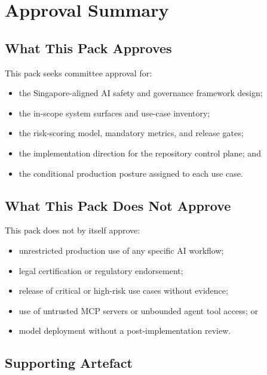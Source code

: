 \documentclass[11pt,a4paper]{article}
\begin{document}
\section{Approval Summary}

\subsection{What This Pack Approves}

This pack seeks committee approval for:

\begin{itemize}[nosep]
    \item the Singapore-aligned AI safety and governance framework design;
    \item the in-scope system surfaces and use-case inventory;
    \item the risk-scoring model, mandatory metrics, and release gates;
    \item the implementation direction for the repository control plane; and
    \item the conditional production posture assigned to each use case.
\end{itemize}

\subsection{What This Pack Does Not Approve}

This pack does not by itself approve:

\begin{itemize}[nosep]
    \item unrestricted production use of any specific AI workflow;
    \item legal certification or regulatory endorsement;
    \item release of critical or high-risk use cases without evidence;
    \item use of untrusted MCP servers or unbounded agent tool access; or
    \item model deployment without a post-implementation review.
\end{itemize}

\subsection{Supporting Artefact}
\end{document}
